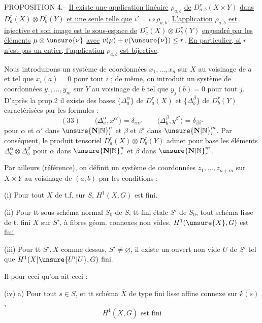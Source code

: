 PROPOSITION 4.-- \uline{Il existe une application linéaire} $\rho_{a,b}$ \uline{de} $D_{a,b}^r(X\times Y)$ \uline{dans} $D_a^r(X)\otimes D_b^r(Y)$ \uline{et une seule telle que} $\iota'=\iota\circ\rho_{a,b}$. \uline{L'application} $\rho_{a,b}$ \uline{est injective et son image est le sous-espace de} $D_a^r(X)\otimes D_b^r(Y)$ \uline{engendré par les éléments} $\mu\otimes\unsure{\nu}$ \uline{avec} $v(\mu)+v(\unsure{\nu})\leq r$. \uline{En particulier, si} $r$ \uline{n'est pas un entier, l'application} $\rho_{a,b}$ \uline{est bijective}.

Nous introduirons un système de coordonnées $x_1,\ldots,x_n$ sur $X$ au voisinage de $a$ et tel que $x_i(a)=0$ pour tout $i$ ; de même, on introduit un système de coordonnées $y_1,\ldots,y_m$ sur $Y$ au voisinage de $b$ tel que $y_j(b)=0$ pour tout $j$. D'après la prop.2 il existe des bases $\{\Delta_a^\alpha\}$ de $D_a^r(X)$ et $\{\Delta_b^\beta\}$ de $D_b^r(Y)$ caractérisées par les formules :
\[
(33)\qquad
\langle\Delta_a^\alpha,x^{\alpha'}\rangle=\delta_{\alpha\alpha'}
\qquad
\langle\Delta_b^\beta,y^{\beta'}\rangle=\delta_{\beta\beta'}
\]
pour $\alpha$ et $\alpha'$ dans $\unsure{\mathbf{N}|\mathbb{N}}_r^n$ et $\beta$ et $\beta'$ dans $\unsure{\mathbf{N}|\mathbb{N}}_r^m$. Par conséquent, le produit tensoriel $D_a^r(X)\otimes D_b^r(Y)$ admet pour base les éléments $\Delta_a^\alpha\otimes\Delta_b^\beta$ pour $\alpha$ dans $\unsure{\mathbf{N}|\mathbb{N}}_r^n$ et $\beta$ dans $\unsure{\mathbf{N}|\mathbb{N}}_r^m$.

Par ailleurs (référence), on définit un système de coordonnées $z_1,\ldots,z_{n+m}$ sur $X\times Y$ au voisinage de $(a,b)$ par les conditions :

(i) Pour tout $X$ de t.f. sur $S$, $H^1(X,G)$ est fini.

(ii) Pour tt sous-schéma  normal
$S_0$ de $S$,  tt  fini étale
$S'$ de $S_0$, tout schéma  lisse de t. fini $X$ sur $S'$, à fibres géom. connexes non vides, $H^1(\unsure{X},G)$ est fini.

(iii) Pour tt $S',X$ comme dessus, $S'\neq\varnothing$, il existe un ouvert non vide $U$ de $S'$ tel que $H^1(X|\unsure{U'|U},G)$  fini.

Il  pour ceci qu'on ait ceci :

(iv) a) Pour tout $s\in S$, et tt schéma $\bar X$ de type fini lisse affine connexe sur $\overline{k(s)}$,
\[
H^1(\bar X,G)\text{ est fini}
\]

